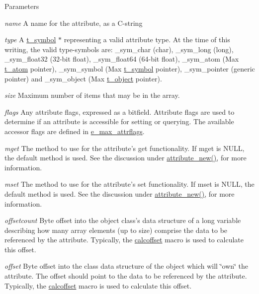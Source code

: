 \begin{DoxyParams}{Parameters}
\item[{\em name}]A name for the attribute, as a C-\/string \item[{\em type}]A \hyperlink{structt__symbol}{t\_\-symbol} $\ast$ representing a valid attribute type. At the time of this writing, the valid type-\/symbols are: {\ttfamily \_\-sym\_\-char} (char), {\ttfamily \_\-sym\_\-long} (long), {\ttfamily \_\-sym\_\-float32} (32-\/bit float), {\ttfamily \_\-sym\_\-float64} (64-\/bit float), {\ttfamily \_\-sym\_\-atom} (Max \hyperlink{structt__atom}{t\_\-atom} pointer), {\ttfamily \_\-sym\_\-symbol} (Max \hyperlink{structt__symbol}{t\_\-symbol} pointer), {\ttfamily \_\-sym\_\-pointer} (generic pointer) and {\ttfamily \_\-sym\_\-object} (Max \hyperlink{structt__object}{t\_\-object} pointer). \item[{\em size}]Maximum number of items that may be in the array. \item[{\em flags}]Any attribute flags, expressed as a bitfield. Attribute flags are used to determine if an attribute is accessible for setting or querying. The available accessor flags are defined in \hyperlink{group__attr_gaf296cfc6741bb19207f6ed8062809115}{e\_\-max\_\-attrflags}. \item[{\em mget}]The method to use for the attribute's {\ttfamily get} functionality. If {\ttfamily mget} is NULL, the default method is used. See the discussion under \hyperlink{group__attr_ga24badeb31a79d844935b2a1c8423c905}{attribute\_\-new()}, for more information. \item[{\em mset}]The method to use for the attribute's {\ttfamily set} functionality. If {\ttfamily mset} is NULL, the default method is used. See the discussion under \hyperlink{group__attr_ga24badeb31a79d844935b2a1c8423c905}{attribute\_\-new()}, for more information. \item[{\em offsetcount}]Byte offset into the object class's data structure of a long variable describing how many array elements (up to {\ttfamily size}) comprise the data to be referenced by the attribute. Typically, the \hyperlink{group__misc_gaad95899dfbc7b5b8fe11921643ef46f0}{calcoffset} macro is used to calculate this offset. \item[{\em offset}]Byte offset into the class data structure of the object which will \char`\"{}own\char`\"{} the attribute. The offset should point to the data to be referenced by the attribute. Typically, the \hyperlink{group__misc_gaad95899dfbc7b5b8fe11921643ef46f0}{calcoffset} macro is used to calculate this offset.\end{DoxyParams}
